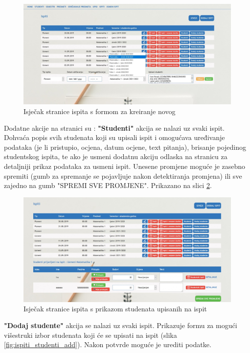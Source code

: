 \documentclass[times, utf8, diplomski]{fer}
\begin{document}
\begin{figure}[htb]
\centering
\includegraphics[width=14cm]{ispiti_addispit.jpg}
\caption{Isječak stranice ispita s formom za kreiranje novog }
\label{fig:ispiti_add}
\end{figure}

Dodatne akcije na stranici su : 
\hfill\break
\textbf{"Studenti"} \hfill\break
akcija se nalazi uz svaki ispit. Dohvaća popis svih studenata koji su upisali ispit i omogućava uređivanje podataka (je li pristupio, ocjena, datum ocjene, text pitanja), brisanje pojedinog studentskog ispita, te ako je usmeni dodatnu akciju odlaska na stranicu za detaljniji prikaz podataka za usmeni ispit. Unesene promjene moguće je zasebno spremiti (gumb za spremanje se pojavljuje nakon detektiranja promjena) ili sve zajedno na gumb "SPREMI SVE PROMJENE". Prikazano na slici \ref{fig:ispiti_studenti}.

\begin{figure}[htb]
\centering
\includegraphics[width=14cm]{ispiti_studenti.jpg}
\caption{Isječak stranice ispita s prikazom studenata upisanih na ispit}
\label{fig:ispiti_studenti}
\end{figure}

\hfill\break
\textbf{"Dodaj studente"} \hfill\break
akcija se nalazi uz svaki ispit. Prikazuje formu za mogući višestruki izbor studenata koji će se upisati na ispit (slika \ref{fig:ispiti_studenti_add}). Nakon potvrde moguće je urediti podatke.
\end{document}
